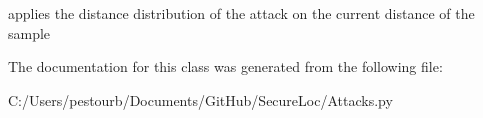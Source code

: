 \begin{DoxyVerb}applies the distance distribution of the attack on the current distance of the sample\end{DoxyVerb}
 

The documentation for this class was generated from the following file\+:\begin{DoxyCompactItemize}
\item 
C\+:/\+Users/pestourb/\+Documents/\+Git\+Hub/\+Secure\+Loc/Attacks.\+py\end{DoxyCompactItemize}
